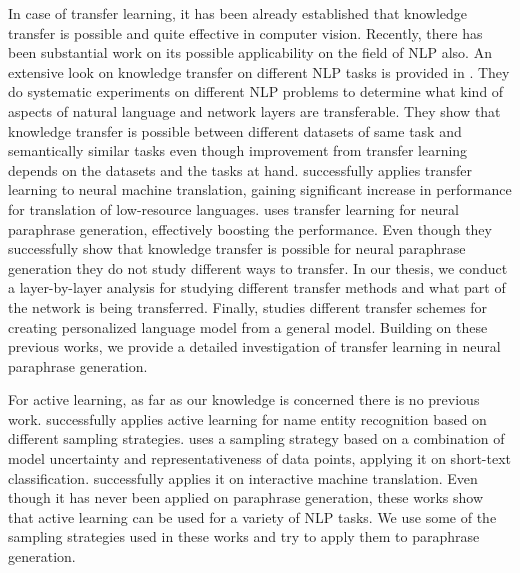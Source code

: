 In case of transfer learning, it has been already established that knowledge transfer is possible and quite effective in computer vision. Recently, there has been substantial work on its possible applicability on the field of NLP also. An extensive look on knowledge transfer on different NLP tasks is provided in \cite{mou}. They do systematic experiments on different NLP problems to determine what kind of aspects of natural language and network layers are transferable. They show that knowledge transfer is possible between different datasets of same task and semantically similar tasks even though improvement from transfer learning depends on the datasets and the tasks at hand. \cite{zoph} successfully applies transfer learning to neural machine translation, gaining significant increase in performance for translation of low-resource languages. \cite{brad} uses transfer learning for neural paraphrase generation, effectively boosting the performance. Even though they successfully show that knowledge transfer is possible for neural paraphrase generation they do not study different ways to transfer. In our thesis, we conduct a layer-by-layer analysis for studying different transfer methods and what part of the network is being transferred. Finally, \cite{yoon} studies different transfer schemes for creating personalized language model from a general model. Building on these previous works, we provide a detailed investigation of transfer learning in neural paraphrase generation.

For active learning, as far as our knowledge is concerned there is no previous work. \cite{shen} successfully applies active learning for name entity recognition based on different sampling strategies. \cite{zhao} uses a sampling strategy based on a combination of model uncertainty and representativeness of data points, applying it on short-text classification. \cite{rubio} successfully applies it on interactive machine translation. Even though it has never been applied on paraphrase generation, these works show that active learning can be used for a variety of NLP tasks. We use some of the sampling strategies used in these works and try to apply them to paraphrase generation.